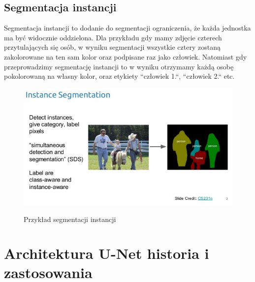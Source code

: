\documentclass{article}
\begin{document}
\subsection{Segmentacja instancji}
Segmentacja instancji to dodanie do segmentacji ograniczenia, że każda jednostka ma być widocznie oddzielona.
Dla przykładu gdy mamy zdjęcie czterech przytulających się osób, w wyniku segmentacji wszystkie cztery zostaną zakolorowane na ten sam kolor oraz podpisane raz jako człowiek.
Natomiast gdy przeprowadzimy segmentację instancji to w wyniku otrzymamy każdą osobę pokolorowaną na własny kolor, oraz etykiety ``człowiek 1.``, ``człowiek 2.`` etc.
\begin{figure}[H]
  \centering
  \includegraphics[width=\linewidth]{images/segmentacja_instancji.jpeg}
  \caption{Przykład segmentacji instancji}
  \cite{patashnik-bibtexing}
  \label{fig:segmentacja_instancji}
\end{figure}
\newpage
\section{Architektura U-Net historia i zastosowania}
\newpage
\end{document}

